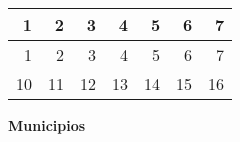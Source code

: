 \documentclass[10pt]{article} %
\begin{document}

\begin{minipage}[t]{.66\linewidth}
\hypertarget{ MtrI }{}
\vspace{0.5cm}\begin{center}
\begin{tabular}{rrrrrrr}
  \hline
1 & 2 & 3 & 4 & 5 & 6 & 7 \\ 
  \hline
  1 &   2 &   3 &   4 &   5 &   6 &   7 \\ 
   10 &  11 &  12 &  13 &  14 &  15 &  16 \\ 
   \hline
\end{tabular}
\end{center}
\end{minipage}\hfill\begin{minipage}[t]{.30\linewidth}
\begin{mdframed}[style=sidebar,frametitle={}]
\textbf{Municipios}\end{mdframed}\hfill\end{minipage}\newpage
\end{document}
